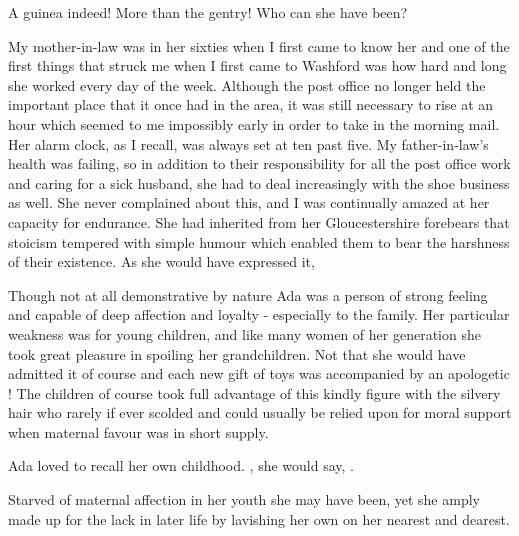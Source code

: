 A guinea indeed! More than the gentry! Who can she have been?

My mother-in-law was in her sixties when I first came to know her and one of the first things that struck me when I first came to Washford was how hard and long she worked every day of the week. Although the post office no longer held the important place that it once had in the area, it was still necessary to rise at an hour which seemed to me impossibly early in order to take in the morning mail. Her alarm clock, as I recall, was always set at ten past five. My father-in-law's health was failing, so in addition to their responsibility for all the post office work and caring for a sick husband, she had to deal increasingly with the shoe business as well. She never complained about this, and I was continually amazed at her capacity for endurance. She had inherited from her Gloucestershire forebears that stoicism tempered with simple humour which enabled them to bear the harshness of their existence. As she would have expressed it, 

Though not at all demonstrative by nature Ada was a person of strong feeling and capable of deep affection and loyalty - especially to the family. Her particular weakness was for young children, and like many women of her generation she took great pleasure in spoiling her grandchildren. Not that she would have admitted it of course and each new gift of toys was accompanied by an apologetic ! The children of course took full advantage of this kindly figure with the silvery hair who rarely if ever scolded and could usually be relied upon for moral support when maternal favour was in short supply.

Ada loved to recall her own childhood. , she would say, .

Starved of maternal affection in her youth she may have been, yet she amply made up for the lack in later life by lavishing her own on her nearest and dearest.

